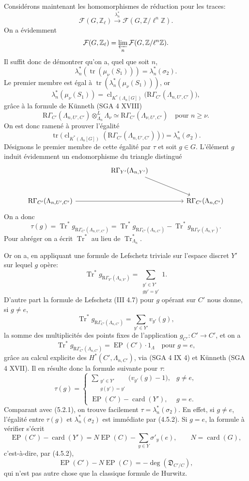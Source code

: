 \documentclass[11pt]{article}
\providecommand{\Tr}{\operatorname{Tr}}
\providecommand{\EP}{\operatorname{EP}}
\providecommand{\Tr}{\operatorname{Tr}}
\providecommand{\Tr}{\operatorname{Tr}}
\providecommand{\Tr}{\operatorname{Tr}}
\providecommand{\EP}{\operatorname{EP}}
\providecommand{\clKstar}[1]{\operatorname{cl}_{K^*(#1)}}
\providecommand{\RG}{\mathrm R\Gamma}
\providecommand{\Tr}{\operatorname{Tr}}
\begin{document}
Considérons maintenant les homomorphismes de réduction pour les traces:
\[
\mathcal F(G,\mathbb Z_\ell)\xrightarrow{\lambda_n^*}\mathcal F(G,\mathbb Z/\ell^n\mathbb Z).
\]
On a évidemment
\[
\mathcal F(G,\mathbb Z_\ell)=\varprojlim_n\mathcal F(G,\mathbb Z/\ell^n\mathbb Z).
\]
Il suffit donc de démontrer qu'on a, quel que soit $n$,
\[
\lambda_n^*(\operatorname{tr}(\mu_\nu(S_1)))=\lambda_n^*(\sigma_2).
\]
Le premier membre est égal à $\operatorname{tr}(\lambda_n^*(\mu_\nu(S_1)))$, or
\[
\lambda_n^*(\mu_\nu(S_1))
=
\clKstar{\Lambda_n[G]}\bigl(\RG_{C'}(\Lambda_{n,U',C'})\bigr),
\]
grâce à la formule de Künneth (SGA 4 XVIII)
\[
\RG_{C'}(\Lambda_{n,U',C'})\otimes_{\Lambda_n}^{L}\Lambda_\nu
\simeq \RG_{C'}(\Lambda_{\nu,U',C'})
\quad\text{pour } n\ge\nu.
\]
On est donc ramené à prouver l'égalité
\[
\operatorname{tr}\bigl(\clKstar{\Lambda_n[G]}(\RG_{C'}(\Lambda_{n,U',C'}))\bigr)
=
\lambda_n^*(\sigma_2).
\]
Désignons le premier membre de cette égalité par $\tau$ et soit $g\in G$. L'élément $g$ induit évidemment un endomorphisme du triangle distingué
\[
\begin{tikzcd}[column sep=huge,row sep=large]
& \RG_{Y'}(\Lambda_{n,Y'}) \arrow[dr] & \\
\RG_{C'}(\Lambda_{n,U',C'}) \arrow[rr] && \RG_{C'}(\Lambda_{n,C'})
\end{tikzcd}
\]
On a donc
\[
\tau(g)=\Tr^*g_{\RG_{C'}(\Lambda_{n,U',C'})}
=\Tr^*g_{\RG_{C'}(\Lambda_{n,C'})}
-\Tr^*g_{\RG_{Y'}(\Lambda_{n,Y'})}.
\]
Pour abréger on a écrit $\Tr^*$ au lieu de $\Tr^*_{\Lambda_n}$.

Or on a, en appliquant une formule de Lefschetz triviale sur l'espace discret $Y'$ sur lequel $g$ opère:
\[
\Tr^*g_{\RG_{Y'}(\Lambda_{n,Y'})}
=
\sum_{\substack{y'\in Y'\\gy'=y'}}1.
\]
D'autre part la formule de Lefschetz (III 4.7) pour $g$ opérant sur $C'$ nous donne, si $g\ne e$,
\[
\Tr^*g_{\RG_{C'}(\Lambda_{n,C'})}
=
\sum_{y'\in Y'} v_{y'}(g),
\]
la somme des multiplicités des points fixes de l'application $g_{C'}:C'\to C'$, et on a
\[
\Tr^*g_{\RG_{C'}(\Lambda_{n,C'})}=\EP(C')\cdot1_\Lambda
\quad\text{pour }g=e,
\]
grâce au calcul explicite des $H^*(C',\Lambda_{n,C'})$, via (SGA 4 IX 4) et Künneth (SGA 4 XVII). Il en résulte donc la formule suivante pour $\tau$:
\[
\tau(g)=
\begin{cases}
\displaystyle\sum_{\substack{y'\in Y'\\g(y')=y'}}\bigl(v_{y'}(g)-1\bigr),& g\ne e,\\[0.8em]
\EP(C')-\operatorname{card}(Y'),& g=e.
\end{cases}
\tag{5.2.2}
\]
Comparant avec (5.2.1), on trouve facilement $\tau=\lambda_n^*(\sigma_2)$. En effet, si $g\ne e$, l'égalité entre $\tau(g)$ et $\lambda_n^*(\sigma_2)$ est immédiate par (4.5.2). Si $g=e$, la formule à vérifier s'écrit
\[
\EP(C')-\operatorname{card}(Y')
=
N\EP(C)-\sum_{y\in Y}\sigma'_y(e),
\qquad N=\operatorname{card}(G),
\]
c'est-à-dire, par (4.5.2),
\[
\EP(C')-N\EP(C)=-\deg(\mathfrak D_{C'/C}),
\]
qui n'est pas autre chose que la classique formule de Hurwitz.
\end{document}
